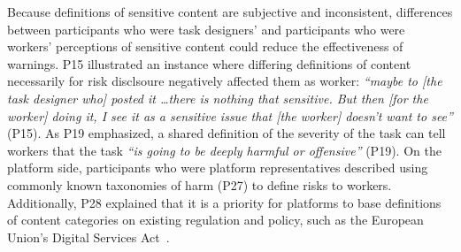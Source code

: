 Because definitions of sensitive content are subjective and inconsistent, differences between participants who were task designers' and participants who were workers' perceptions of sensitive content could reduce the effectiveness of warnings. 
P15 illustrated an instance where differing definitions of content necessarily for risk disclsoure negatively affected them as worker: \textit{``maybe to [the task designer who] posted it \dots there is nothing that sensitive. But then [for the worker] doing it, I see it as a sensitive issue that [the worker] doesn't want to see''} (P15). As P19 emphasized, a shared definition of the severity of the task can tell workers that the task \textit{``is going to be deeply harmful or offensive''} (P19). On the platform side, participants who were platform representatives described using commonly known taxonomies of harm (P27) to define risks to workers. Additionally, P28 explained that it is a priority for platforms to base definitions of content categories on existing regulation and policy, such as the European Union's Digital Services Act~\cite{EU-DSA-2022}.


